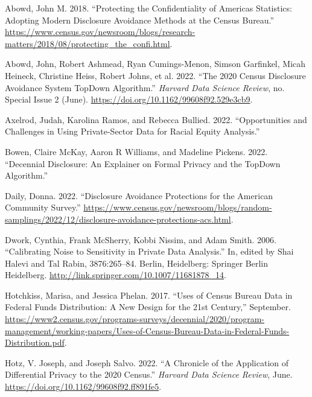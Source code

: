 \documentclass[
]{urban-formatting}
\newlength{\cslhangindent}
\newlength{\cslentryspacingunit} %
\newenvironment{CSLReferences}[2] %
 {%
  \setlength{\parindent}{0pt}
  \ifodd #1
  \let\oldpar\par
  \def\par{\hangindent=\cslhangindent\oldpar}
  \fi
  \setlength{\parskip}{#2\cslentryspacingunit}
 }%
 {}
\begin{document}
\hypertarget{refs}{}
\begin{CSLReferences}{1}{0}
\leavevmode{}%
Abowd, John M. 2018. {``Protecting the Confidentiality of Americas
Statistics: Adopting Modern Disclosure Avoidance Methods at the Census
Bureau.''}
\url{https://www.census.gov/newsroom/blogs/research-matters/2018/08/protecting_the_confi.html}.

\leavevmode{}%
Abowd, John, Robert Ashmead, Ryan Cumings-Menon, Simson Garfinkel, Micah
Heineck, Christine Heiss, Robert Johns, et al. 2022. {``The 2020 Census
Disclosure Avoidance System TopDown Algorithm.''} \emph{Harvard Data
Science Review}, no. Special Issue 2 (June).
\url{https://doi.org/10.1162/99608f92.529e3cb9}.

\leavevmode{}%
Axelrod, Judah, Karolina Ramos, and Rebecca Bullied. 2022.
{``Opportunities and Challenges in Using Private-Sector Data for Racial
Equity Analysis.''}

\leavevmode{}%
Bowen, Claire McKay, Aaron R Williams, and Madeline Pickens. 2022.
{``Decennial Disclosure: An Explainer on Formal Privacy and the TopDown
Algorithm.''}

\leavevmode{}%
Daily, Donna. 2022. {``Disclosure Avoidance Protections for the American
Community Survey.''}
\url{https://www.census.gov/newsroom/blogs/random-samplings/2022/12/disclosure-avoidance-protections-acs.html}.

\leavevmode{}%
Dwork, Cynthia, Frank McSherry, Kobbi Nissim, and Adam Smith. 2006.
{``Calibrating Noise to Sensitivity in Private Data Analysis.''} In,
edited by Shai Halevi and Tal Rabin, 3876:265--84. Berlin, Heidelberg:
Springer Berlin Heidelberg.
\url{http://link.springer.com/10.1007/11681878_14}.

\leavevmode{}%
Hotchkiss, Marisa, and Jessica Phelan. 2017. {``Uses of Census Bureau
Data in Federal Funds Distribution: A New Design for the 21st
Century,''} September.
\url{https://www2.census.gov/programs-surveys/decennial/2020/program-management/working-papers/Uses-of-Census-Bureau-Data-in-Federal-Funds-Distribution.pdf}.

\leavevmode{}%
Hotz, V. Joseph, and Joseph Salvo. 2022. {``A Chronicle of the
Application of Differential Privacy to the 2020 Census.''} \emph{Harvard
Data Science Review}, June.
\url{https://doi.org/10.1162/99608f92.ff891fe5}.


\end{CSLReferences}
\end{document}
